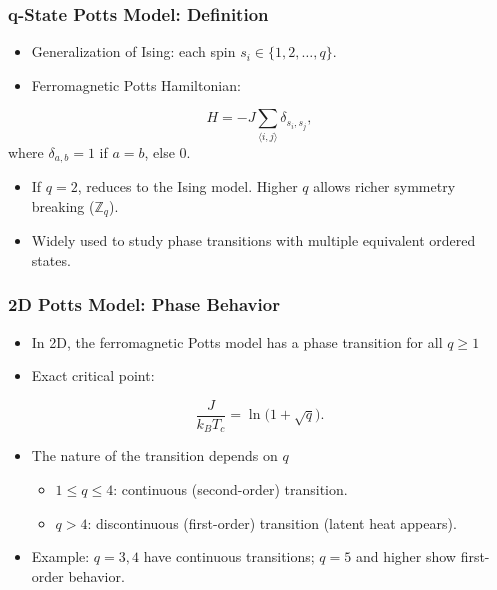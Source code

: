 \documentclass{beamer}
\begin{document}
\begin{frame}
\frametitle{q-State Potts Model: Definition}

\begin{itemize}
\item Generalization of Ising: each spin $s_i \in \{1,2,\dots,q\}$.

\item Ferromagnetic Potts Hamiltonian:
\end{itemize}

\noindent
     \[
       H = -J \sum_{\langle i,j\rangle} \delta_{s_i,s_j},
     \]
where $\delta_{a,b}=1$ if $a=b$, else $0$.
\begin{itemize}
\item If $q=2$, reduces to the Ising model. Higher $q$ allows richer symmetry breaking ($\mathbb{Z}_q$).

\item Widely used to study phase transitions with multiple equivalent ordered states.
\end{itemize}

\noindent
\end{frame}

\begin{frame}
\frametitle{2D Potts Model: Phase Behavior}

\begin{itemize}
\item In 2D, the ferromagnetic Potts model has a phase transition for all $q\ge1$ 

\item Exact critical point:
\end{itemize}

\noindent
     \[
       \frac{J}{k_B T_c} = \ln\!\bigl(1+\sqrt{q}\bigr).
     \]
\begin{itemize}
\item The nature of the transition depends on $q$ 
\begin{itemize}

  \item $1 \le q \le 4$: continuous (second-order) transition.

  \item $q > 4$: discontinuous (first-order) transition (latent heat appears).

\end{itemize}

\noindent
\item Example: $q=3,4$ have continuous transitions; $q=5$ and higher show first-order behavior.
\end{itemize}

\noindent
\end{frame}
\end{document}
